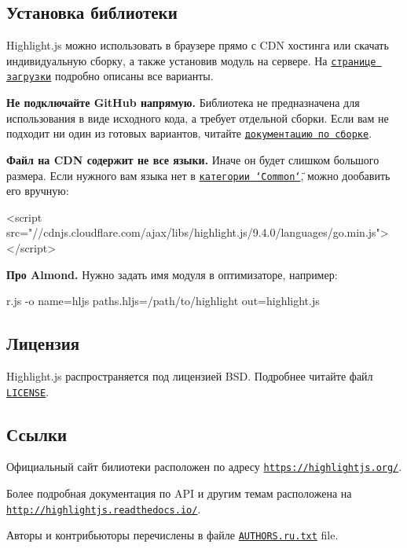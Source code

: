\subsection*{Установка библиотеки}

Highlight.\+js можно использовать в браузере прямо с C\+DN хостинга или скачать индивидуальную сборку, а также установив модуль на сервере. На \href{https://highlightjs.org/download/}{\tt странице загрузки} подробно описаны все варианты.

{\bfseries Не подключайте Git\+Hub напрямую.} Библиотека не предназначена для использования в виде исходного кода, а требует отдельной сборки. Если вам не подходит ни один из готовых вариантов, читайте \href{http://highlightjs.readthedocs.io/en/latest/building-testing.html}{\tt документацию по сборке}.

{\bfseries Файл на C\+DN содержит не все языки.} Иначе он будет слишком большого размера. Если нужного вам языка нет в \href{https://highlightjs.org/download/}{\tt категории \char`\"{}\+Common\char`\"{}}, можно дообавить его вручную\+:


\begin{DoxyCode}
<script src="//cdnjs.cloudflare.com/ajax/libs/highlight.js/9.4.0/languages/go.min.js"></script>
\end{DoxyCode}


{\bfseries Про Almond.} Нужно задать имя модуля в оптимизаторе, например\+:


\begin{DoxyCode}
r.js -o name=hljs paths.hljs=/path/to/highlight out=highlight.js
\end{DoxyCode}


\subsection*{Лицензия}

Highlight.\+js распространяется под лицензией B\+SD. Подробнее читайте файл \href{https://github.com/highlightjs/highlight.js/blob/master/LICENSE}{\tt L\+I\+C\+E\+N\+SE}.

\subsection*{Ссылки}

Официальный сайт билиотеки расположен по адресу \href{https://highlightjs.org/}{\tt https\+://highlightjs.\+org/}.

Более подробная документация по A\+PI и другим темам расположена на \href{http://highlightjs.readthedocs.io/}{\tt http\+://highlightjs.\+readthedocs.\+io/}.

Авторы и контрибьюторы перечислены в файле \href{https://github.com/highlightjs/highlight.js/blob/master/AUTHORS.ru.txt}{\tt A\+U\+T\+H\+O\+R\+S.\+ru.\+txt} file. 